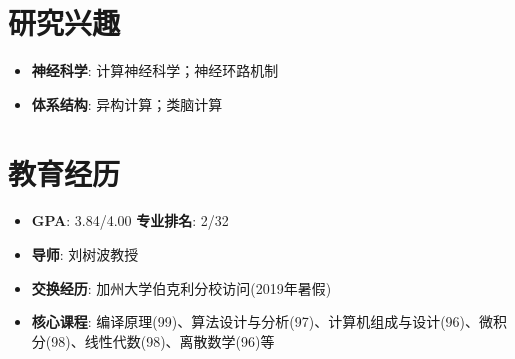 \documentclass{resume}
\begin{document}
    

\section{{\bfseries 研究兴趣}}
\begin{itemize}[parsep=0.2ex]
\item \textbf{神经科学}: 计算神经科学；神经环路机制
\item \textbf{体系结构}: 异构计算；类脑计算
\end{itemize}

\section{{\bfseries 教育经历}}
\begin{itemize}[parsep=0.1ex]
	\item \textbf{GPA}: 3.84/4.00  \textbf{专业排名}: 2/32
	\item \textbf{导师}: 刘树波教授
	\item \textbf{交换经历}: 加州大学伯克利分校访问(2019年暑假)
	\item \textbf{核心课程}: 编译原理(99)、算法设计与分析(97)、计算机组成与设计(96)、微积分(98)、线性代数(98)、离散数学(96)等
\end{itemize}
\end{document}
